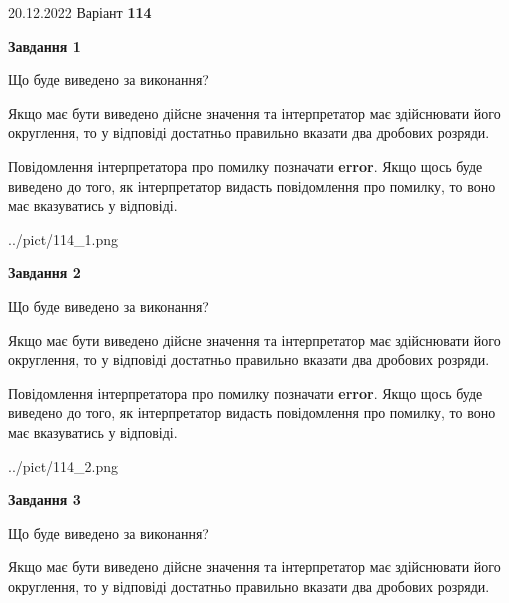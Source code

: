 \documentclass[12pt, ukrainian]{article}
\begin{document}
{20.12.2022 Варіант \No \textbf { 114 }\par}
{
\begin {Large}

{\begin {center}\textbf{Завдання 1}\end {center}}\par
Що буде виведено за виконання? \par

Якщо має бути виведено дійсне значення та інтерпретатор має здійснювати його округлення, 
то у відповіді достатньо правильно вказати два дробових розряди.

Повідомлення інтерпретатора про помилку позначати \textbf{error}.
Якщо щось буде виведено до того, як інтерпретатор видасть повідомлення про помилку, 
то воно має вказуватись у відповіді. \par

\begin{center}
	{../pict/114_1.png}
\end{center}
\newpage

{\begin {center}\textbf{Завдання 2}\end {center}}\par
Що буде виведено за виконання? \par

Якщо має бути виведено дійсне значення та інтерпретатор має здійснювати його округлення, 
то у відповіді достатньо правильно вказати два дробових розряди.

Повідомлення інтерпретатора про помилку позначати \textbf{error}.
Якщо щось буде виведено до того, як інтерпретатор видасть повідомлення про помилку, 
то воно має вказуватись у відповіді. \par

\begin{center}
	{../pict/114_2.png}
\end{center}
\newpage

{\begin {center}\textbf{Завдання 3}\end {center}}\par
Що буде виведено за виконання? \par

Якщо має бути виведено дійсне значення та інтерпретатор має здійснювати його округлення, 
то у відповіді достатньо правильно вказати два дробових розряди.


\end{Large}}
\end{document}
